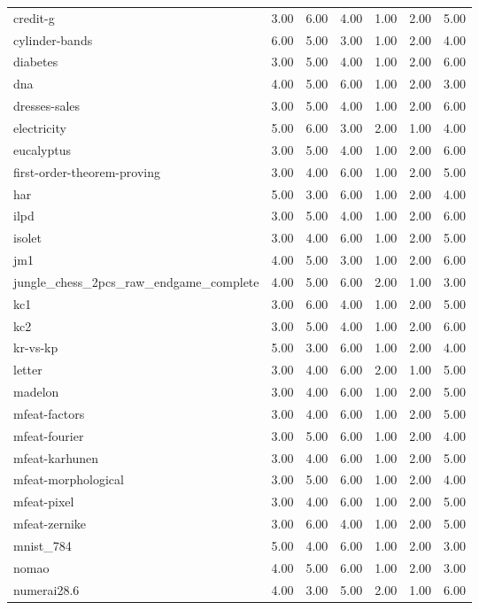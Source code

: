 \begin{table}[htbp]
\begin{tabular}{lrrrrrr}
credit-g & 3.00 & 6.00 & 4.00 & 1.00 & 2.00 & 5.00 \\
cylinder-bands & 6.00 & 5.00 & 3.00 & 1.00 & 2.00 & 4.00 \\
diabetes & 3.00 & 5.00 & 4.00 & 1.00 & 2.00 & 6.00 \\
dna & 4.00 & 5.00 & 6.00 & 1.00 & 2.00 & 3.00 \\
dresses-sales & 3.00 & 5.00 & 4.00 & 1.00 & 2.00 & 6.00 \\
electricity & 5.00 & 6.00 & 3.00 & 2.00 & 1.00 & 4.00 \\
eucalyptus & 3.00 & 5.00 & 4.00 & 1.00 & 2.00 & 6.00 \\
first-order-theorem-proving & 3.00 & 4.00 & 6.00 & 1.00 & 2.00 & 5.00 \\
har & 5.00 & 3.00 & 6.00 & 1.00 & 2.00 & 4.00 \\
ilpd & 3.00 & 5.00 & 4.00 & 1.00 & 2.00 & 6.00 \\
isolet & 3.00 & 4.00 & 6.00 & 1.00 & 2.00 & 5.00 \\
jm1 & 4.00 & 5.00 & 3.00 & 1.00 & 2.00 & 6.00 \\
jungle\_chess\_2pcs\_raw\_endgame\_complete & 4.00 & 5.00 & 6.00 & 2.00 & 1.00 & 3.00 \\
kc1 & 3.00 & 6.00 & 4.00 & 1.00 & 2.00 & 5.00 \\
kc2 & 3.00 & 5.00 & 4.00 & 1.00 & 2.00 & 6.00 \\
kr-vs-kp & 5.00 & 3.00 & 6.00 & 1.00 & 2.00 & 4.00 \\
letter & 3.00 & 4.00 & 6.00 & 2.00 & 1.00 & 5.00 \\
madelon & 3.00 & 4.00 & 6.00 & 1.00 & 2.00 & 5.00 \\
mfeat-factors & 3.00 & 4.00 & 6.00 & 1.00 & 2.00 & 5.00 \\
mfeat-fourier & 3.00 & 5.00 & 6.00 & 1.00 & 2.00 & 4.00 \\
mfeat-karhunen & 3.00 & 4.00 & 6.00 & 1.00 & 2.00 & 5.00 \\
mfeat-morphological & 3.00 & 5.00 & 6.00 & 1.00 & 2.00 & 4.00 \\
mfeat-pixel & 3.00 & 4.00 & 6.00 & 1.00 & 2.00 & 5.00 \\
mfeat-zernike & 3.00 & 6.00 & 4.00 & 1.00 & 2.00 & 5.00 \\
mnist\_784 & 5.00 & 4.00 & 6.00 & 1.00 & 2.00 & 3.00 \\
nomao & 4.00 & 5.00 & 6.00 & 1.00 & 2.00 & 3.00 \\
numerai28.6 & 4.00 & 3.00 & 5.00 & 2.00 & 1.00 & 6.00 \\

\end{tabular}
\end{table}

